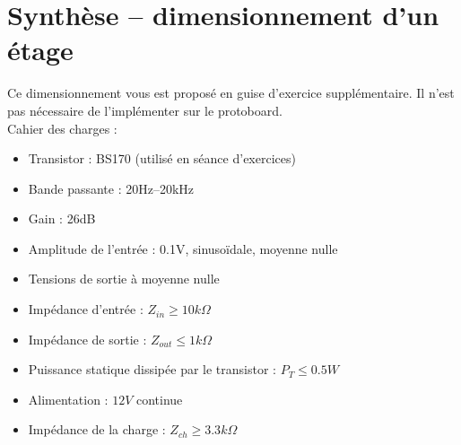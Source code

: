 \documentclass{../template/labo}
\begin{document}
\begin{manip}
{}
\end{manip}

\section{Synthèse -- dimensionnement d'un étage}
Ce dimensionnement vous est proposé en guise d'exercice supplémentaire. Il n'est pas nécessaire de l'implémenter sur le protoboard.\\

Cahier des charges :
\begin{itemize}
\item Transistor : BS170 (utilisé en séance d'exercices)
\item Bande passante : 20Hz--20kHz
\item Gain : 26dB
\item Amplitude de l'entrée : 0.1V, sinusoïdale, moyenne nulle
\item Tensions de sortie à moyenne nulle
\item Impédance d'entrée : $Z_{in}\geq10k\Omega$
\item Impédance de sortie : $Z_{out}\leq 1k\Omega$
\item Puissance statique dissipée par le transistor : $P_T\leq 0.5W$
\item Alimentation : $12V$ continue
\item Impédance de la charge : $Z_{ch}\geq 3.3k\Omega$
\end{itemize}
\end{document}
